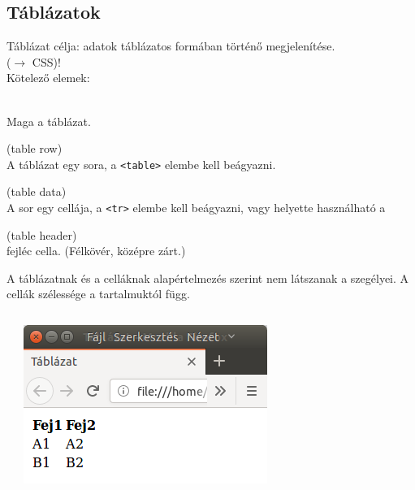 \subsection{Táblázatok}

\begin{frame}
  Táblázat célja: adatok táblázatos formában történő megjelenítése.\\
   ($\to$ CSS)!\\
  Kötelező elemek:
  \begin{description}[m]
    \item[\texttt{<table>}] \hfill \\ Maga a táblázat.
    \item[\texttt{<tr>}] (table row) \hfill \\ A táblázat egy sora, a \texttt{<table>} elembe kell beágyazni.
    \item[\texttt{<td>}] (table data) \hfill \\ A sor egy cellája, a \texttt{<tr>} elembe kell beágyazni, vagy helyette használható a
    \item[\texttt{<th>}] (table header) \hfill \\ fejléc cella. (Félkövér, középre zárt.)
  \end{description}
  A táblázatnak és a celláknak alapértelmezés szerint nem látszanak a szegélyei. A cellák szélessége a tartalmuktól függ.
\end{frame}

\begin{frame}
  \begin{columns}[c]
      \begin{exampleblock}{}
        
      \end{exampleblock}
      \centering \includegraphics[width=\textwidth]{tabla1.png}
  \end{columns} 
\end{frame}

